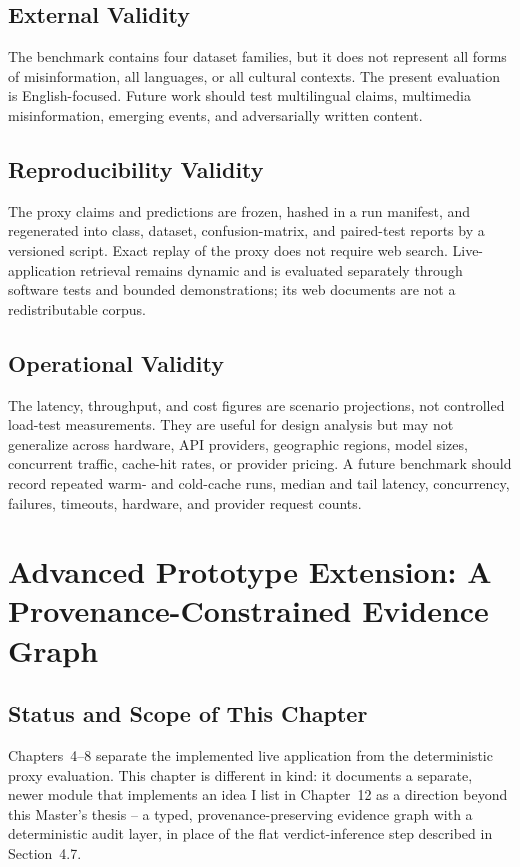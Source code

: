 \documentclass[12pt,a4paper,openany]{report}
\begin{document}
\section{External Validity}
The benchmark contains four dataset families, but it does not represent all forms of misinformation, all languages, or all cultural contexts. The present evaluation is English-focused. Future work should test multilingual claims, multimedia misinformation, emerging events, and adversarially written content.

\section{Reproducibility Validity}
The proxy claims and predictions are frozen, hashed in a run manifest, and regenerated into class, dataset, confusion-matrix, and paired-test reports by a versioned script. Exact replay of the proxy does not require web search. Live-application retrieval remains dynamic and is evaluated separately through software tests and bounded demonstrations; its web documents are not a redistributable corpus.

\section{Operational Validity}
The latency, throughput, and cost figures are scenario projections, not controlled load-test measurements. They are useful for design analysis but may not generalize across hardware, API providers, geographic regions, model sizes, concurrent traffic, cache-hit rates, or provider pricing. A future benchmark should record repeated warm- and cold-cache runs, median and tail latency, concurrency, failures, timeouts, hardware, and provider request counts.

\chapter{Advanced Prototype Extension: A Provenance-Constrained Evidence Graph}
\label{ch:advanced}
\section{Status and Scope of This Chapter}
Chapters~4--8 separate the implemented live application from the deterministic proxy evaluation. This chapter is different in kind: it documents a separate, newer module that implements an idea I list in Chapter~12 as a direction beyond this Master's thesis -- a typed, provenance-preserving evidence graph with a deterministic audit layer, in place of the flat verdict-inference step described in Section~4.7.
\end{document}
